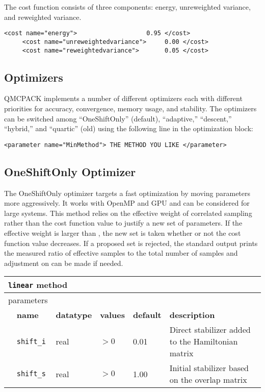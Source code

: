 The cost function consists of three components: energy, unreweighted variance, and reweighted variance.
\begin{lstlisting}[style=QMCPXML]
     <cost name="energy">                   0.95 </cost>
     <cost name="unreweightedvariance">     0.00 </cost>
     <cost name="reweightedvariance">       0.05 </cost>
\end{lstlisting}

\subsection{Optimizers}
QMCPACK implements a number of different optimizers each with different priorities for accuracy, convergence, memory usage, and stability.
The optimizers can be switched among  ``OneShiftOnly'' (default), ``adaptive,'' ``descent,'' ``hybrid,'' and ``quartic'' (old) using the following line in the optimization block:
\begin{lstlisting}
<parameter name="MinMethod"> THE METHOD YOU LIKE </parameter>
\end{lstlisting}

\subsection{OneShiftOnly Optimizer}
The OneShiftOnly optimizer targets a fast optimization by moving parameters more aggressively. It works with OpenMP and GPU and can be considered for large systems.
This method relies on the effective weight of correlated sampling rather than the cost function value to justify a new set of parameters.
If the effective weight is larger than , the new set is taken whether or not the cost function value decreases.
If a proposed set is rejected, the standard output prints the measured ratio of effective samples to the total number of samples
and adjustment on  can be made if needed.

\begin{table}[h]
\begin{center}
\begin{tabularx}{\textwidth}{l l l l l X }
\hline
\multicolumn{6}{l}{\texttt{linear} method} \\
\hline
\multicolumn{2}{l}{parameters}  & \multicolumn{4}{l}{}\\
   &   \bfseries name     & \bfseries datatype & \bfseries values & \bfseries default   & \bfseries description \\
   &   \texttt{shift\_i} &  real     & $>0$ & 0.01 & Direct stabilizer added to the Hamiltonian matrix\\
   &   \texttt{shift\_s} &  real     & $>0$ & 1.00 & Initial stabilizer based on the overlap matrix\\
  \hline
\end{tabularx}
\end{center}
\end{table}

